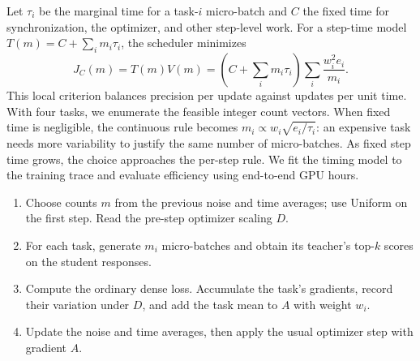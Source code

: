 Let $\tau_i$ be the marginal time for a task-$i$ micro-batch and $C$ the
fixed time for synchronization, the optimizer, and other step-level work.
For a step-time model $T(m)=C+\sum_i m_i\tau_i$, the scheduler minimizes
\begin{equation}
    J_C(m)=T(m)V(m)
          =\left(C+\sum_i m_i\tau_i\right)
           \sum_i\frac{w_i^2e_i}{m_i}.
    \label{eq:batch_cost_objective}
\end{equation}
This local criterion balances precision per update against updates per
unit time. With four tasks, we enumerate the feasible integer count vectors.
When fixed time is negligible, the continuous rule becomes
$m_i\propto w_i\sqrt{e_i/\tau_i}$: an expensive task needs more variability
to justify the same number of micro-batches. As fixed step time grows,
the choice approaches the per-step rule. We fit the timing model to the
training trace and evaluate efficiency using end-to-end GPU hours.

\begin{algorithm}[t]
\caption{One training step with GPAS.}
\label{alg:batch_gpas}
\small
\begin{minipage}{0.97\linewidth}
\begin{enumerate}
    \item Choose counts $m$ from the previous noise and time averages;
    use Uniform on the first step. Read the pre-step optimizer scaling $D$.
    \item For each task, generate $m_i$ micro-batches and obtain its
    teacher's top-$k$ scores on the student responses.
    \item Compute the ordinary dense loss. Accumulate the task's
    gradients, record their variation under $D$, and add the task mean
    to $A$ with weight $w_i$.
    \item Update the noise and time averages, then apply the usual
    optimizer step with gradient $A$.
\end{enumerate}
\end{minipage}
\end{algorithm}
